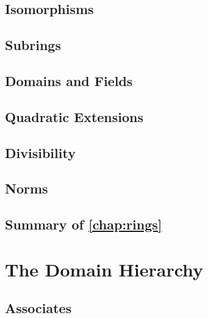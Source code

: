 \documentclass{memoir}
\begin{document}
    \section{Isomorphisms}
      \label{sec:ring-isos}
      
      \newpage

    \section{Subrings}
      \label{sec:subrings}
      
      \newpage

    \section{Domains and Fields}
      \label{sec:domains-and-fields}
      
      \newpage

    \section{Quadratic Extensions}
      \label{sec:quad-ext}
      
      \newpage

    \section{Divisibility}
      \label{sec:divisibility}
      
      \newpage

    \section{Norms}
      \label{sec:norms}
      
      \newpage

    \section*{Summary of \autoref{chap:rings}}
      


  \chapter{The Domain Hierarchy}
    \label{chap:domains}
    
    \newpage

    \section{Associates}
      \label{sec:associates}
      
      \newpage
\end{document}
